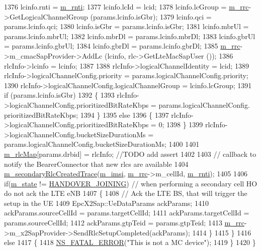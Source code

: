 \begin{DoxyCode}
1376     lcinfo.rnti = \hyperlink{classns3_1_1UeManager_a5a72b4fe818f21993bd7f05d7e2c4f83}{m\_rnti};
1377     lcinfo.lcId = lcid;
1378     lcinfo.lcGroup = \hyperlink{classns3_1_1UeManager_ab4405e9f354c66e7c1a4c95832290f5b}{m\_rrc}->GetLogicalChannelGroup (params.lcinfo.isGbr);
1379     lcinfo.qci = params.lcinfo.qci;
1380     lcinfo.isGbr = params.lcinfo.isGbr;
1381     lcinfo.mbrUl = params.lcinfo.mbrUl;
1382     lcinfo.mbrDl = params.lcinfo.mbrDl;
1383     lcinfo.gbrUl = params.lcinfo.gbrUl;
1384     lcinfo.gbrDl = params.lcinfo.gbrDl;
1385     \hyperlink{classns3_1_1UeManager_ab4405e9f354c66e7c1a4c95832290f5b}{m\_rrc}->m\_cmacSapProvider->AddLc (lcinfo, rlc->GetLteMacSapUser ());
1386     rlcInfo->lcinfo = lcinfo;
1387 
1388     rlcInfo->logicalChannelIdentity = lcid;
1389     rlcInfo->logicalChannelConfig.priority = params.logicalChannelConfig.priority;
1390     rlcInfo->logicalChannelConfig.logicalChannelGroup = lcinfo.lcGroup;
1391     \textcolor{keywordflow}{if} (params.lcinfo.isGbr)
1392       \{
1393         rlcInfo->logicalChannelConfig.prioritizedBitRateKbps = params.logicalChannelConfig.
      prioritizedBitRateKbps;
1394       \}
1395     \textcolor{keywordflow}{else}
1396       \{
1397         rlcInfo->logicalChannelConfig.prioritizedBitRateKbps = 0;
1398       \}
1399     rlcInfo->logicalChannelConfig.bucketSizeDurationMs = params.logicalChannelConfig.bucketSizeDurationMs;
1400 
1401     \hyperlink{classns3_1_1UeManager_a64f37a901db7a322552ba08d87e65770}{m\_rlcMap}[params.drbid] = rlcInfo; \textcolor{comment}{//TODO add assert }
1402 
1403     \textcolor{comment}{// callback to notify the BearerConnector that new rlcs are available}
1404     \hyperlink{classns3_1_1UeManager_a1fd26ae2275ed93d13fefd27d1b89307}{m\_secondaryRlcCreatedTrace}(\hyperlink{classns3_1_1UeManager_a868dda076ecfc1d4202e357c16223d84}{m\_imsi}, \hyperlink{classns3_1_1UeManager_ab4405e9f354c66e7c1a4c95832290f5b}{m\_rrc}->m\_cellId, 
      \hyperlink{classns3_1_1UeManager_a5a72b4fe818f21993bd7f05d7e2c4f83}{m\_rnti});
1405 
1406     \textcolor{keywordflow}{if}(\hyperlink{classns3_1_1UeManager_aaed4b2490297cb912e743084f1a27b08}{m\_state} != \hyperlink{classns3_1_1UeManager_a2f4085fdd18d7125c27da44a5b8b6808a093669f7255c35aa11645ba004a896ea}{HANDOVER\_JOINING}) \textcolor{comment}{// when performing a secondary cell HO do not
       ack the LTE eNB}
1407     \{
1408       \textcolor{comment}{// Ack the LTE BS, that will trigger the setup in the UE}
1409       EpcX2Sap::UeDataParams ackParams;
1410       ackParams.sourceCellId = params.targetCellId;
1411       ackParams.targetCellId = params.sourceCellId;
1412       ackParams.gtpTeid = params.gtpTeid;  
1413       \hyperlink{classns3_1_1UeManager_ab4405e9f354c66e7c1a4c95832290f5b}{m\_rrc}->m\_x2SapProvider->SendRlcSetupCompleted(ackParams);
1414     \} 
1415   \}
1416   \textcolor{keywordflow}{else}
1417   \{
1418     \hyperlink{group__fatal_ga5131d5e3f75d7d4cbfd706ac456fdc85}{NS\_FATAL\_ERROR}(\textcolor{stringliteral}{"This is not a MC device"});
1419   \}
1420 \}
\end{DoxyCode}


